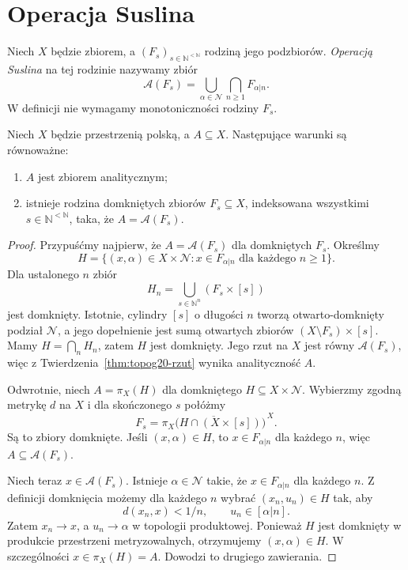 \section{Operacja Suslina}
\label{sec:topog20-suslin}

\begin{definicja}
\label{def:topog20-suslin}
Niech \(X\) będzie zbiorem,
a \((F_s)_{s\in\mathbb N^{<\mathbb N}}\)
rodziną jego podzbiorów.
\emph{Operacją Suslina}
na tej rodzinie nazywamy zbiór
\[
 \mathcal A(F_s)=
 \bigcup_{\alpha\in\mathcal N}
     \bigcap_{n\ge1}F_{\alpha|n}.
\]
W definicji nie wymagamy
monotoniczności rodziny \(F_s\).
\end{definicja}

\begin{twierdzenie}
\label{thm:topog20-suslin}
Niech \(X\) będzie przestrzenią polską,
a \(A\subseteq X\).
Następujące warunki są równoważne:
\begin{enumerate}[label=\textup{(\roman*)}]
\item \(A\) jest zbiorem analitycznym;
\item istnieje rodzina domkniętych
zbiorów \(F_s\subseteq X\),
indeksowana wszystkimi
\(s\in\mathbb N^{<\mathbb N}\),
taka, że \(A=\mathcal A(F_s)\).
\end{enumerate}
\end{twierdzenie}
\begin{proof}
Przypuśćmy najpierw, że
\(A=\mathcal A(F_s)\)
dla domkniętych \(F_s\).
Określmy
\[
 H=\{(x,\alpha)\in X\times\mathcal N:
       x\in F_{\alpha|n}
       \text{ dla każdego }n\ge1\}.
\]
Dla ustalonego \(n\) zbiór
\[
 H_n=\bigcup_{s\in\mathbb N^n}
                         (F_s\times[s])
\]
jest domknięty.
Istotnie, cylindry \([s]\)
o długości \(n\) tworzą
otwarto-domknięty podział
\(\mathcal N\), a jego dopełnienie
jest sumą otwartych zbiorów
\((X\setminus F_s)\times[s]\).
Mamy \(H=\bigcap_n H_n\),
zatem \(H\) jest domknięty.
Jego rzut na \(X\)
jest równy \(\mathcal A(F_s)\),
więc z
Twierdzenia~\ref{thm:topog20-rzut}
wynika analityczność \(A\).

Odwrotnie, niech
\(A=\pi_X(H)\) dla domkniętego
\(H\subseteq X\times\mathcal N\).
Wybierzmy zgodną metrykę \(d\)
na \(X\) i dla skończonego \(s\)
połóżmy
\[
 F_s=
 \overline{\pi_X\bigl(
     H\cap(X\times[s])\bigr)}^{\,X}.
\]
Są to zbiory domknięte.
Jeśli \((x,\alpha)\in H\),
to \(x\in F_{\alpha|n}\)
dla każdego \(n\),
więc \(A\subseteq\mathcal A(F_s)\).

Niech teraz
\(x\in\mathcal A(F_s)\).
Istnieje \(\alpha\in\mathcal N\)
takie, że
\(x\in F_{\alpha|n}\)
dla każdego \(n\).
Z definicji domknięcia
możemy dla każdego \(n\)
wybrać \((x_n,u_n)\in H\)
tak, aby
\[
 d(x_n,x)<1/n,\qquad
 u_n\in[\alpha|n].
\]
Zatem \(x_n\to x\),
a \(u_n\to\alpha\)
w topologii produktowej.
Ponieważ \(H\) jest domknięty
w produkcie przestrzeni metryzowalnych,
otrzymujemy \((x,\alpha)\in H\).
W szczególności
\(x\in\pi_X(H)=A\).
Dowodzi to drugiego zawierania.
\end{proof}

